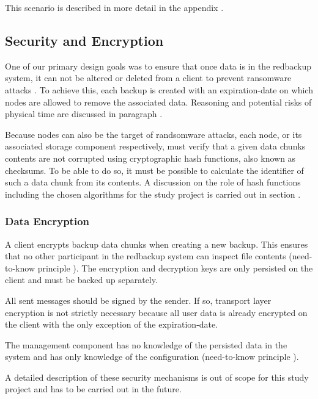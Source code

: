 This scenario is described in more detail in the appendix .

\subsection{Security and Encryption}\label{sec:security-and-encryption}
One of our primary design goals was to ensure that once data is in the redbackup system, it can not be altered or deleted from a \gls{client} to prevent ransomware attacks \cite{young-cryptovirology}. To achieve this, each backup is created with an \gls{expiration-date} on which \glspl{node} are allowed to remove the associated data. Reasoning and potential risks of physical time are discussed in paragraph .

Because \glspl{node} can also be the target of randsomware attacks, each \gls{node}, or its associated \gls{storage} component respectively, must verify that a given data \gls{chunk}s contents are not corrupted using cryptographic hash functions, also known as checksums. To be able to do so, it must be possible to calculate the identifier of such a data \gls{chunk} from its contents. A discussion on the role of hash functions including the chosen algorithms for the study project is carried out in section .

\subsubsection{Data Encryption}

A \gls{client} encrypts backup data \glspl{chunk} when creating a new backup. This ensures that no other participant in the redbackup system can inspect file contents (need-to-know principle \cite{security-patterns}). The encryption and decryption keys are only persisted on the client and must be backed up separately.

All sent \glspl{message} should be signed by the sender. If so, transport layer encryption is not strictly necessary because all user data is already encrypted on the \gls{client} with the only exception of the \gls{expiration-date}.

The \gls{management} component has no knowledge of the persisted data in the system and has only knowledge of the configuration (need-to-know principle \cite{security-patterns}).

A detailed description of these security mechanisms is out of scope for this study project and has to be carried out in the future.


